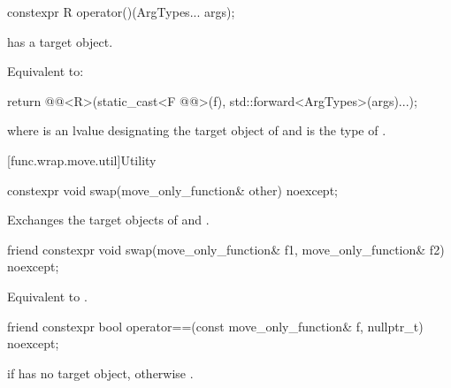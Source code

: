 %
\begin{itemdecl}
constexpr R operator()(ArgTypes... args);
\end{itemdecl}

\begin{itemdescr}
\pnum
\expects
{} has a target object.

\pnum
\effects
Equivalent to:
\begin{codeblock}
return @@<R>(static_cast<F @@>(f), std::forward<ArgTypes>(args)...);
\end{codeblock}
where  is an lvalue designating the target object of  and  is the type of .
\end{itemdescr}

[func.wrap.move.util]{Utility}

%
\begin{itemdecl}
constexpr void swap(move_only_function& other) noexcept;
\end{itemdecl}

\begin{itemdescr}
\pnum
\effects
Exchanges the target objects of  and .
\end{itemdescr}

%
\begin{itemdecl}
friend constexpr void swap(move_only_function& f1, move_only_function& f2) noexcept;
\end{itemdecl}

\begin{itemdescr}
\pnum
\effects
Equivalent to .
\end{itemdescr}

%
\begin{itemdecl}
friend constexpr bool operator==(const move_only_function& f, nullptr_t) noexcept;
\end{itemdecl}

\begin{itemdescr}
\pnum
\returns
{} if  has no target object, otherwise .
\end{itemdescr}
